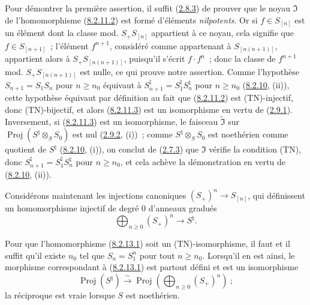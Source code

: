 Pour démontrer la première assertion, il suffit
(\hyperref[II.2.8.3-fr]{2.8.3}) de prouver que le noyau $\mathfrak{I}$ de
l'homomorphisme (\hyperref[II.8.2.11.2-fr]{8.2.11.2}) est formé d'éléments
\emph{nilpotents}. Or si $f\in S_{[n]}$ est un élément dont la classe mod.
$S_+S_{[n]}$ appartient à ce noyau, cela signifie que $f\in S_{[n+1]}$~;
l'élément $f^{n+1}$, considéré comme appartenant à $S_{[n(n+1)]}$, appartient
alors à $S_+S_{[n(n+1)]}$, puisqu'il s'écrit $f\cdot f^n$~; donc la classe de
$f^{n+1}$ mod. $S_+S_{[n(n+1)]}$ est nulle, ce qui prouve notre assertion.
Comme l'hypothèse $S_{n+1}=S_1S_n$ pour $n\geq n_0$ équivaut à
$S_{n+1}^{\natural}=S_1^{\natural}S_n^{\natural}$ pour $n\geq n_0$
(\hyperref[II.8.2.10-fr]{8.2.10}, (ii)), cette hypothèse équivaut par définition
au fait que (\hyperref[II.8.2.11.2-fr]{8.2.11.2}) est (TN)-injectif, donc
(TN)-bijectif, et alors (\hyperref[II.8.2.11.3-fr]{8.2.11.3}) est un
isomorphisme en vertu de (\hyperref[II.2.9.1-fr]{2.9.1}). Inversement, si
(\hyperref[II.8.2.11.3-fr]{8.2.11.3}) est un isomorphisme, le faisceau
$\widetilde{\mathfrak{I}}$ sur
$\operatorname{Proj}(S^{\natural}\otimes_S S_0)$ est nul
(\hyperref[II.2.9.2-fr]{2.9.2}, (i))~; comme
$S^{\natural}\otimes_S S_0$ est noethérien comme quotient de $S^{\natural}$
(\hyperref[II.8.2.10-fr]{8.2.10}, (i)), on conclut de
(\hyperref[II.2.7.3-fr]{2.7.3}) que $\mathfrak{I}$ vérifie la condition (TN),
donc $S_{n+1}^{\natural}=S_1^{\natural}S_n^{\natural}$ pour $n\geq n_0$, et
cela achève la démonstration en vertu de
(\hyperref[II.8.2.10-fr]{8.2.10}, (ii)).

\begin{env}[8.2.13]
\label{II.8.2.13-fr}
Considérons maintenant les injections canoniques $(S_+)^n\to S_{[n]}$, qui
définissent un homomorphisme injectif de degré $0$ d'anneaux gradués
\begin{equation}
\label{II.8.2.13.1-fr}
  \bigoplus_{n\geq0}(S_+)^n\to S^{\natural}.
\tag{8.2.13.1}
\end{equation}
\end{env}

\begin{proposition}[8.2.14]
\label{II.8.2.14-fr}
Pour que l'homomorphisme (\hyperref[II.8.2.13.1-fr]{8.2.13.1}) soit un
(TN)-isomorphisme, il faut et il suffit qu'il existe $n_0$ tel que
$S_n=S_1^n$ pour tout $n\geq n_0$. Lorsqu'il en est ainsi, le morphisme
correspondant à (\hyperref[II.8.2.13.1-fr]{8.2.13.1}) est partout défini et
est un isomorphisme
\[
  \operatorname{Proj}(S^{\natural})\xrightarrow{\sim}
  \operatorname{Proj}\left(\bigoplus_{n\geq0}(S_+)^n\right)~;
\]
la réciproque est vraie lorsque $S$ est noethérien.
\end{proposition}


